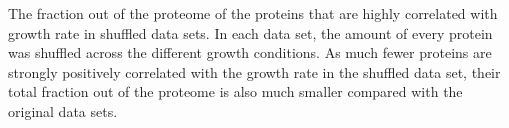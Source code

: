The fraction out of the proteome of the proteins that are highly correlated with growth rate in shuffled data sets.
In each data set, the amount of every protein was shuffled across the different growth conditions.
As much fewer proteins are strongly positively correlated with the growth rate in the shuffled data set, their total fraction out of the proteome is also much smaller compared with the original data sets.